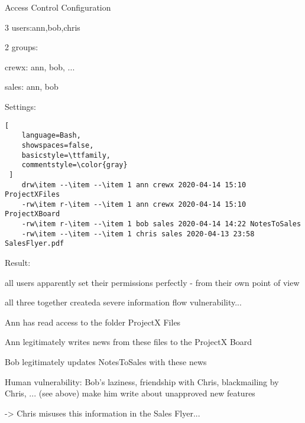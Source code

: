 \documentclass[a4paper]{article}
\begin{document}
\begin{multicols}{3}
    Access Control Configuration
    \begin{itemize*}
        \item 3 users:ann,bob,chris
        \item 2 groups:
              \begin{itemize*}
                  \item crewx: ann, bob, ...
                  \item sales: ann, bob
              \end{itemize*}
        \item Settings:
              \begin{lstlisting}[
    language=Bash,
    showspaces=false,
    basicstyle=\ttfamily,
    commentstyle=\color{gray}
 ]
    drw\item --\item --\item 1 ann crewx 2020-04-14 15:10 ProjectXFiles
    -rw\item r-\item --\item 1 ann crewx 2020-04-14 15:10 ProjectXBoard
    -rw\item r-\item --\item 1 bob sales 2020-04-14 14:22 NotesToSales
    -rw\item --\item --\item 1 chris sales 2020-04-13 23:58 SalesFlyer.pdf
  \end{lstlisting}
        \item Result:
              \begin{itemize*}
                  \item all users apparently set their permissions perfectly - from their own point of view
                  \item all three together createda severe information flow vulnerability...
              \end{itemize*}
        \item Ann has read access to the folder ProjectX Files
        \item Ann legitimately writes news from these files to the ProjectX Board
        \item Bob legitimately updates NotesToSales with these news
        \item Human vulnerability: Bob’s laziness, friendship with Chris, blackmailing by Chris, ... (see above) make him write about unapproved new features
        \item ->  Chris misuses this information in the Sales Flyer...
    \end{itemize*}


\end{multicols}
\end{document}
